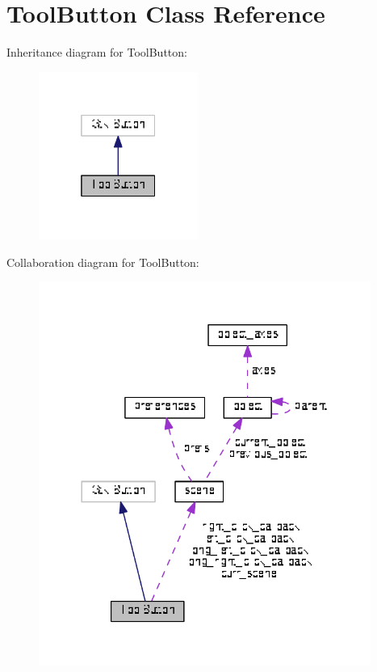 \hypertarget{classToolButton}{}\section{Tool\+Button Class Reference}
\label{classToolButton}


Inheritance diagram for Tool\+Button\+:\nopagebreak
\begin{figure}[H]
\begin{center}
\leavevmode
\includegraphics[width=148pt]{classToolButton__inherit__graph}
\end{center}
\end{figure}


Collaboration diagram for Tool\+Button\+:\nopagebreak
\begin{figure}[H]
\begin{center}
\leavevmode
\includegraphics[width=308pt]{classToolButton__coll__graph}
\end{center}
\end{figure}
